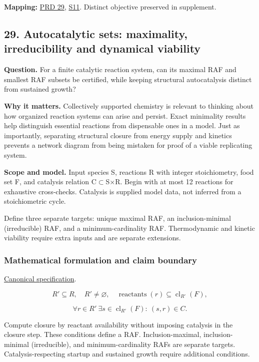 \documentclass[
  11pt,
]{article}
\begin{document}
\textbf{Mapping:}
\href{https://github.com/rick-stevens-ai/Pure-Thought/blob/main/PRDs/29-Chemical-Reaction-Networks-Origins.md}{PRD
29},
\href{https://github.com/rick-stevens-ai/Pure-Thought/blob/main/supplemental/S11.md}{S11}.
Distinct objective preserved in supplement.

\subsection{29. Autocatalytic sets: maximality, irreducibility and
dynamical viability}

\textbf{Question.} For a finite catalytic reaction system, can its
maximal RAF and smallest RAF subsets be certified, while keeping
structural autocatalysis distinct from sustained growth?

\textbf{Why it matters.} Collectively supported chemistry is relevant to
thinking about how organized reaction systems can arise and persist.
Exact minimality results help distinguish essential reactions from
dispensable ones in a model. Just as importantly, separating structural
closure from energy supply and kinetics prevents a network diagram from
being mistaken for proof of a viable replicating system.

\textbf{Scope and model.} Input species S, reactions R with integer
stoichiometry, food set F, and catalysis relation
C\ensuremath{\subset}S\ensuremath{\times}R. Begin with at most 12
reactions for exhaustive cross-checks. Catalysis is supplied model data,
not inferred from a stoichiometric cycle.

Define three separate targets: unique maximal RAF, an inclusion-minimal
(irreducible) RAF, and a minimum-cardinality RAF. Thermodynamic and
kinetic viability require extra inputs and are separate extensions.

\subsubsection{Mathematical formulation and claim boundary}

\href{https://github.com/rick-stevens-ai/Pure-Thought/blob/main/PRDs/29-Chemical-Reaction-Networks-Origins.md}{Canonical
specification}.

\[R'\subseteq R,\quad R'\ne\varnothing,\quad
\operatorname{reactants}(r)\subseteq\operatorname{cl}_{R'}(F),\]

\[\forall r\in R'\ \exists s\in\operatorname{cl}_{R'}(F):\ (s,r)\in C.\]

Compute closure by reactant availability without imposing catalysis in
the closure step. These conditions define a RAF. Inclusion-maximal,
inclusion-minimal (irreducible), and minimum-cardinality RAFs are
separate targets. Catalysis-respecting startup and sustained growth
require additional conditions.
\end{document}
